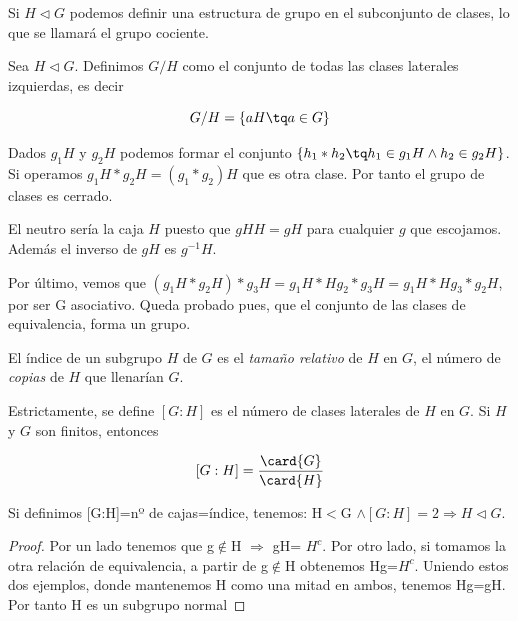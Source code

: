 \documentclass[a4paper,10pt]{apuntes}
\begin{document}
  Si $H\lhd G$  podemos definir una estructura de grupo en el subconjunto de clases, lo que se llamará el grupo cociente.
  
  \begin{defn} Sea $H \lhd G$. Definimos $G / H$ como el conjunto de todas las clases laterales izquierdas, es decir
  
  \[ G/H = \{ aH \tq a \in G\} \]
 \end{defn}
  
  
  Dados $g_{1}H$  y $g_{2}H$  podemos formar el conjunto $\{h_{1}\ast h_{2}\tq h_{1}\in g_{1}H \wedge h_{2}\in g_{2}H\}$. Si operamos   $g_{1}H\ast g_{2}H=(g_{1}\ast g_{2})H$  que es otra clase. Por tanto el grupo de clases es cerrado.
  
  El neutro sería la caja $H$ puesto que $gHH=gH$ para cualquier $g$ que escojamos. Además el inverso de $gH$ es $g^{-1}H$.
  
  Por último, vemos que $(g_{1}H\ast g_{2}H)\ast g_{3}H=g_{1}H\ast Hg_{2}\ast g_{3}H=g_{1}H\ast Hg_{3}\ast g_{2}H$, por ser G asociativo. Queda probado pues, que el conjunto de las clases de equivalencia, forma un grupo.
  
\begin{defn} El índice de un subgrupo $H$ de $G$ es el \textit{tamaño relativo} de $H$ en $G$, el número de \textit{copias} de $H$ que llenarían $G$.  

Estrictamente, se define $[G:H]$ es el número de clases laterales de $H$ en $G$. Si $H$ y $G$ son finitos, entonces 

\[ [G:H] = \frac{\card{G}}{\card{H}} \]
\end{defn}

  \begin{theorem}
   Si definimos [G:H]=nº de cajas=índice, tenemos:
   H$<$G $\wedge[G:H]=2 \Rightarrow H \lhd G$.
  \end{theorem}
  \begin{proof}
   Por un lado tenemos que g$\notin$H $\Rightarrow$  gH= $H^{c}$.
   Por otro lado, si tomamos la otra relación de equivalencia, a partir de g$\notin$H obtenemos Hg=$H^{c}$.
   Uniendo estos dos ejemplos, donde mantenemos H como una mitad en ambos, tenemos Hg=gH. Por tanto H es un subgrupo normal
  \end{proof}
  
\end{document}
